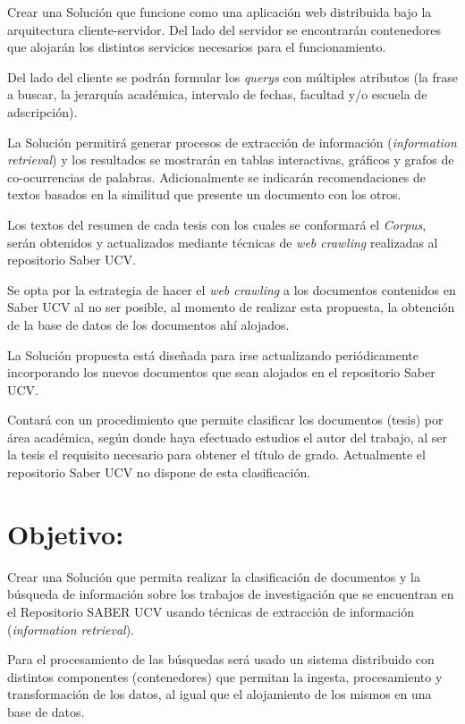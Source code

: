 \documentclass[
  10,
  openany]{book}
\begin{document}
Crear una Solución que funcione como una aplicación web distribuida bajo la arquitectura cliente-servidor. Del lado del servidor se encontrarán contenedores que alojarán los distintos servicios necesarios para el funcionamiento.

Del lado del cliente se podrán formular los \emph{querys} con múltiples atributos (la frase a buscar, la jerarquía académica, intervalo de fechas, facultad y/o escuela de adscripción).

La Solución permitirá generar procesos de extracción de información (\emph{information retrieval}) y los resultados se mostrarán en tablas interactivas, gráficos y grafos de co-ocurrencias de palabras. Adicionalmente se indicarán recomendaciones de textos basados en la similitud que presente un documento con los otros.

Los textos del resumen de cada tesis con los cuales se conformará el \emph{Corpus}, serán obtenidos y actualizados mediante técnicas de \emph{web crawling} realizadas al repositorio Saber UCV.

Se opta por la estrategia de hacer el \emph{web crawling} a los documentos contenidos en Saber UCV al no ser posible, al momento de realizar esta propuesta, la obtención de la base de datos de los documentos ahí alojados.

La Solución propuesta está diseñada para irse actualizando periódicamente incorporando los nuevos documentos que sean alojados en el repositorio Saber UCV.

Contará con un procedimiento que permite clasificar los documentos (tesis) por área académica, según donde haya efectuado estudios el autor del trabajo, al ser la tesis el requisito necesario para obtener el título de grado. Actualmente el repositorio Saber UCV no dispone de esta clasificación.

\hypertarget{objetivogral}{%
\section{Objetivo:}\label{objetivogral}}

Crear una Solución que permita realizar la clasificación de documentos y la búsqueda de información sobre los trabajos de investigación que se encuentran en el Repositorio SABER UCV usando técnicas de extracción de información (\emph{information retrieval}).

Para el procesamiento de las búsquedas será usado un sistema distribuido con distintos componentes (contenedores) que permitan la ingesta, procesamiento y transformación de los datos, al igual que el alojamiento de los mismos en una base de datos.
\end{document}
